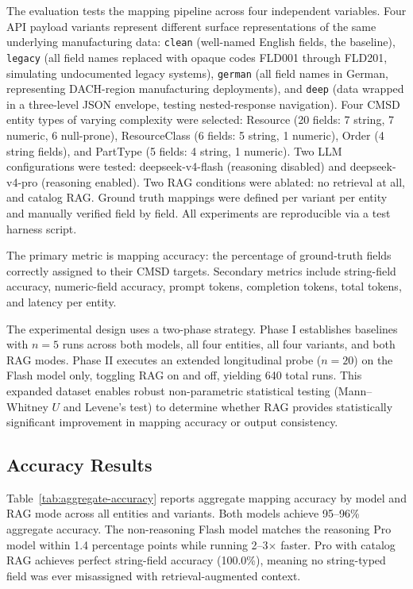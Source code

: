 \documentclass[3p,times,procedia]{elsarticle}
\begin{document}
The evaluation tests the mapping pipeline across four independent variables. Four API payload variants represent different surface representations of the same underlying manufacturing data: \texttt{clean} (well-named English fields, the baseline), \texttt{legacy} (all field names replaced with opaque codes FLD001 through FLD201, simulating undocumented legacy systems), \texttt{german} (all field names in German, representing DACH-region manufacturing deployments), and \texttt{deep} (data wrapped in a three-level JSON envelope, testing nested-response navigation). Four CMSD entity types of varying complexity were selected: Resource (20 fields: 7 string, 7 numeric, 6 null-prone), ResourceClass (6 fields: 5 string, 1 numeric), Order (4 string fields), and PartType (5 fields: 4 string, 1 numeric). Two LLM configurations were tested: deepseek-v4-flash (reasoning disabled) and deepseek-v4-pro (reasoning enabled). Two RAG conditions were ablated: no retrieval at all, and catalog RAG. Ground truth mappings were defined per variant per entity and manually verified field by field. All experiments are reproducible via a test harness script.

The primary metric is mapping accuracy: the percentage of ground-truth fields correctly assigned to their CMSD targets. Secondary metrics include string-field accuracy, numeric-field accuracy, prompt tokens, completion tokens, total tokens, and latency per entity.

The experimental design uses a two-phase strategy. Phase I establishes baselines with $n = 5$ runs across both models, all four entities, all four variants, and both RAG modes. Phase II executes an extended longitudinal probe ($n = 20$) on the Flash model only, toggling RAG on and off, yielding 640 total runs. This expanded dataset enables robust non-parametric statistical testing (Mann--Whitney $U$ and Levene's test) to determine whether RAG provides statistically significant improvement in mapping accuracy or output consistency.


\subsection{Accuracy Results}
\label{sec:eval-accuracy}

Table~\ref{tab:aggregate-accuracy} reports aggregate mapping accuracy by model and RAG mode across all entities and variants. Both models achieve 95--96\% aggregate accuracy. The non-reasoning Flash model matches the reasoning Pro model within 1.4 percentage points while running 2--3$\times$ faster. Pro with catalog RAG achieves perfect string-field accuracy (100.0\%), meaning no string-typed field was ever misassigned with retrieval-augmented context.
\end{document}
